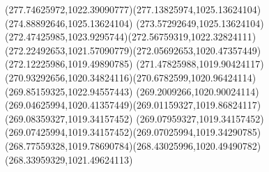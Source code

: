 {{		\curveto(277.74625972,1022.39090777)(277.13825974,1025.13624104)(274.88892646,1025.13624104)
		\curveto(273.57292649,1025.13624104)(272.47425985,1023.9295744)(272.56759319,1022.32824111)
		\curveto(272.22492653,1021.57090779)(272.05692653,1020.47357449)(272.12225986,1019.49890785)
		\curveto(271.47825988,1019.90424117)(270.93292656,1020.34824116)(270.6782599,1020.96424114)
		\lineto(269.85159325,1022.94557443)
		\lineto(269.2009266,1020.90024114)
		\curveto(269.04625994,1020.41357449)(269.01159327,1019.86824117)(269.08359327,1019.34157452)
		\curveto(269.07959327,1019.34157452)(269.07425994,1019.34157452)(269.07025994,1019.34290785)
		\curveto(268.77559328,1019.78690784)(268.43025996,1020.49490782)(268.33959329,1021.49624113)
	}
}